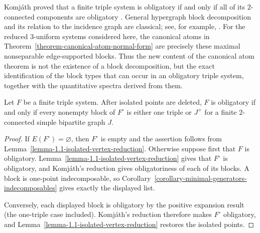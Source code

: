 
\begin{remark}
\label{remark-komjath-block-reduction}
Komj\'ath proved that a finite triple system is obligatory if and only if all
of its $2$-connected components are obligatory \citep{komjath2001}.  General
hypergraph block decomposition and its relation to the incidence graph are
classical; see, for example, \citet{bahmanian2015}.  For the reduced
$3$-uniform systems considered here, the canonical atoms in
Theorem~\ref{theorem-canonical-atom-normal-form} are precisely these maximal
nonseparable edge-supported blocks.  Thus the new content of the canonical
atom theorem is not the existence of a block decomposition, but the exact
identification of the block types that can occur in an obligatory triple
system, together with the quantitative spectra derived from them.
\end{remark}

\begin{corollary}
\label{corollary-block-formulation}
Let $F$ be a finite triple system.  After isolated points are deleted, $F$ is
obligatory if and only if every nonempty block of $F^\circ$ is either one
triple or $J^+$ for a finite $2$-connected simple bipartite graph $J$.
\end{corollary}
\begin{proof}
If $E(F^\circ)=\varnothing$, then $F^\circ$ is empty and the assertion follows
from Lemma~\ref{lemma-1.1-isolated-vertex-reduction}.  Otherwise suppose first
that $F$ is obligatory.  Lemma~\ref{lemma-1.1-isolated-vertex-reduction}
gives that $F^\circ$ is obligatory, and Komj\'ath's reduction gives
obligatoriness of each of its blocks.  A block is one-point indecomposable,
so Corollary~\ref{corollary-minimal-generators-indecomposables} gives exactly
the displayed list.

Conversely, each displayed block is obligatory by the positive expansion
result (the one-triple case included).  Komj\'ath's reduction therefore makes
$F^\circ$ obligatory, and Lemma~\ref{lemma-1.1-isolated-vertex-reduction}
restores the isolated points.
\end{proof}

